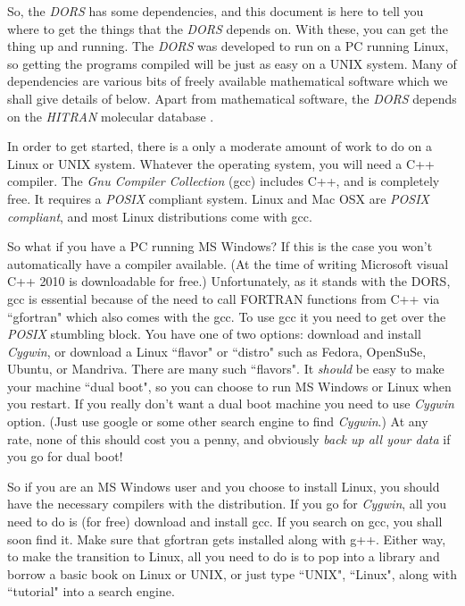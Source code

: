 \documentclass[12pt]{article}
\begin{document}
 So, the {\it DORS} has some dependencies, and this document is here to tell you
where to get the things that the {\it DORS} depends on. With these, you can get the thing up and running.
The {\it DORS} was developed to run on a PC running Linux, so getting the programs compiled
will be just as easy on a UNIX system. Many of  dependencies are  various bits of freely
available mathematical software which we shall give details of below. Apart from mathematical
software, the {\it DORS}
 depends on the {\it HITRAN}
molecular database \cite{RothmanETAL:Mybib}.

 In order to get started, there is a only a moderate
amount of work to do on a Linux or UNIX system. Whatever the operating system, you will need a C++ compiler.
The {\it Gnu Compiler Collection} (gcc) includes C++, and is  completely free. It requires a {\it POSIX} compliant system.
Linux and Mac OSX are { \it POSIX compliant}, and most Linux distributions come with gcc. 

 So what if you have
a PC running MS Windows? 
If this is the
case you won't automatically have a compiler available. (At the time of writing Microsoft visual C++ 2010 is
 downloadable for free.) Unfortunately, as it stands with the DORS, gcc is essential because of the need to
call FORTRAN functions from C++ via ``gfortran" which also comes with the gcc. To use gcc it you need 
to get over the {\it POSIX} stumbling block. 
You have one of two options: download and install {\it Cygwin}, or download a Linux ``flavor" or ``distro" 
 such as Fedora, OpenSuSe, Ubuntu, or Mandriva. There are many such ``flavors". It {\it should} be easy to make
your machine ``dual boot", so you can choose to run MS Windows or Linux when you restart.
If you  really don't want a dual boot machine you need to use {\it Cygwin} option. (Just use google or some other search engine
to find {\it Cygwin}.) At any rate, none of this should cost you a penny, and obviously {\it back up all
your data } if you go for dual boot! 


So if you are an MS Windows user  and you choose to install Linux, you should have the necessary compilers
with the distribution. If you
go for {\it Cygwin}, all
you need to do is (for free) download and install gcc.
If you search on gcc, you shall soon find it. Make sure that gfortran gets installed
along with g++. 
Either way, to make the transition to Linux, all you need to do is to pop into a library and borrow a basic book on Linux
 or UNIX, or just type ``UNIX", ``Linux", along with  ``tutorial" into a search engine.
\end{document}
